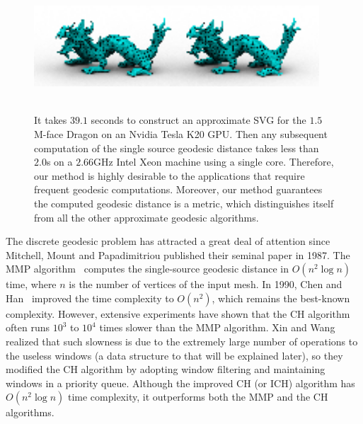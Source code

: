 \begin{figure}[htbp]
\centering
\includegraphics[width=0.95\textwidth]{figs/svg/teaser_2000_final_v2.png}\\
 \\
\label{fig:teaser}
\caption{It takes $39.1$ seconds to construct an
approximate SVG for the $1.5$M-face Dragon on an Nvidia Tesla K20
GPU. Then any subsequent computation of the single source geodesic
distance takes less than $2.0$s on a $2.66$GHz Intel Xeon machine
using a single core. Therefore, our method is highly desirable to
the applications that require frequent geodesic computations.
Moreover, our method guarantees the computed geodesic distance is a
metric, which distinguishes itself from all the other approximate
geodesic algorithms.}
\end{figure}

The discrete geodesic problem has attracted a great deal of
attention since Mitchell, Mount and Papadimitriou published their
seminal paper in 1987. The MMP algorithm~\cite{Mitchell_Etc:1987}
computes the single-source geodesic distance in $O(n^2\log n)$ time,
where $n$ is the number of vertices of the input mesh. In 1990, Chen
and Han~\cite{Chen_Han:1990} improved the time complexity to
$O(n^2)$, which remains the best-known complexity. However,
extensive experiments have shown that the CH algorithm often runs
$10^3$ to $10^4$ times slower than the MMP algorithm. Xin and Wang
realized that such slowness is due to the extremely large number of
operations to the useless windows (a data structure to that will be
explained later), so they modified the CH algorithm by adopting
window filtering and maintaining windows in a priority queue.
Although the improved CH (or ICH) algorithm has $O(n^2\log n)$ time
complexity, it outperforms both the MMP and the CH algorithms.

